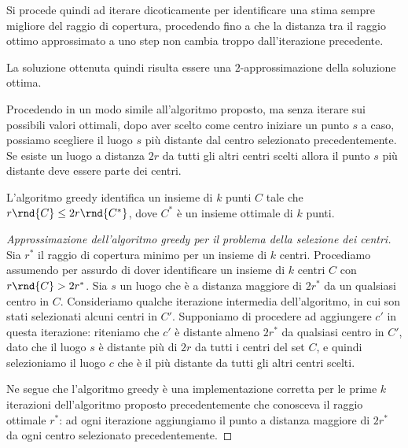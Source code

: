 \documentclass[\main/main.tex]{subfiles}
\begin{document}
\begin{multicols}{2}
\begin{observation}
    Si procede quindi ad iterare dicoticamente per identificare una stima sempre migliore del raggio di copertura, procedendo fino a che la distanza tra il raggio ottimo approssimato a uno step non cambia troppo dall'iterazione precedente.
    
    La soluzione ottenuta quindi risulta essere una \(2\)-approssimazione della soluzione ottima.
\end{observation}
\vfill\null
\begin{definition}
    Procedendo in un modo simile all'algoritmo proposto, ma senza iterare sui possibili valori ottimali, dopo aver scelto come centro iniziare un punto \(s\) a caso, possiamo scegliere il luogo \(s\) più distante dal centro selezionato precedentemente. Se esiste un luogo a distanza \(2r\) da tutti gli altri centri scelti allora il punto \(s\) più distante deve essere parte dei centri.
\end{definition}
\begin{lemma}
    L'algoritmo greedy identifica un insieme di \(k\) punti \(C\) tale che \(r\rnd{C} \leq 2r\rnd{C^*}\), dove \(C^*\) è un insieme ottimale di \(k\) punti.
\end{lemma}
\begin{proof}[Approssimazione dell'algoritmo greedy per il problema della selezione dei centri]
    Sia \(r^*\) il raggio di copertura minimo per un insieme di \(k\) centri. Procediamo assumendo per assurdo di dover identificare un insieme di \(k\) centri \(C\) con \(r\rnd{C} > 2r^*\). Sia \(s\) un luogo che è a distanza maggiore di \(2r^*\) da un qualsiasi centro in \(C\). Consideriamo qualche iterazione intermedia dell'algoritmo, in cui son stati selezionati alcuni centri in \(C'\). Supponiamo di procedere ad aggiungere \(c'\) in questa iterazione: riteniamo che \(c'\) è distante almeno \(2r^*\) da qualsiasi centro in \(C'\), dato che il luogo \(s\) è distante più di \(2r\) da tutti i centri del set \(C\), e quindi selezioniamo il luogo \(c\) che è il più distante da tutti gli altri centri scelti.
    
    Ne segue che l'algoritmo greedy è una implementazione corretta per le prime \(k\) iterazioni dell'algoritmo proposto precedentemente che conosceva il raggio ottimale \(r^*\): ad ogni iterazione aggiungiamo il punto a distanza maggiore di \(2r^*\) da ogni centro selezionato precedentemente.
    

\end{proof}
\end{multicols}
\end{document}
